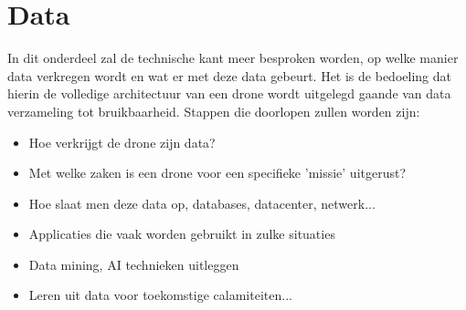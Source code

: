 \chapter{Data}
In dit onderdeel zal de technische kant meer besproken worden, op welke manier data verkregen wordt en wat er met deze data gebeurt. Het is de bedoeling dat hierin de volledige architectuur van een drone wordt uitgelegd gaande van data verzameling tot bruikbaarheid. Stappen die doorlopen zullen worden zijn:
\begin{itemize}
    \item Hoe verkrijgt de drone zijn data?
    \item Met welke zaken is een drone voor een specifieke 'missie' uitgerust?
    \item Hoe slaat men deze data op, databases, datacenter, netwerk...
    \item Applicaties die vaak worden gebruikt in zulke situaties 
    \item Data mining, AI technieken uitleggen
    \item Leren uit data voor toekomstige calamiteiten...
\end{itemize}